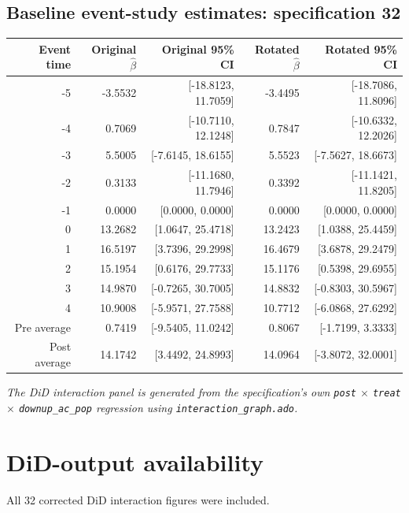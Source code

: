 \documentclass[10pt]{article}
\begin{document}
\subsection*{Baseline event-study estimates: specification 32}
\begin{center}
\scriptsize
\begin{tabular}{r rr rr}
\toprule
Event time & Original $\hat\beta$ & Original 95\% CI & Rotated $\hat\beta$ & Rotated 95\% CI \\
\midrule
-5 & -3.5532 & [-18.8123, 11.7059] & -3.4495 & [-18.7086, 11.8096] \\
-4 & 0.7069 & [-10.7110, 12.1248] & 0.7847 & [-10.6332, 12.2026] \\
-3 & 5.5005 & [-7.6145, 18.6155] & 5.5523 & [-7.5627, 18.6673] \\
-2 & 0.3133 & [-11.1680, 11.7946] & 0.3392 & [-11.1421, 11.8205] \\
-1 & 0.0000 & [0.0000, 0.0000] & 0.0000 & [0.0000, 0.0000] \\
0 & 13.2682 & [1.0647, 25.4718] & 13.2423 & [1.0388, 25.4459] \\
1 & 16.5197 & [3.7396, 29.2998] & 16.4679 & [3.6878, 29.2479] \\
2 & 15.1954 & [0.6176, 29.7733] & 15.1176 & [0.5398, 29.6955] \\
3 & 14.9870 & [-0.7265, 30.7005] & 14.8832 & [-0.8303, 30.5967] \\
4 & 10.9008 & [-5.9571, 27.7588] & 10.7712 & [-6.0868, 27.6292] \\
\midrule
Pre average & 0.7419 & [-9.5405, 11.0242] & 0.8067 & [-1.7199, 3.3333] \\
Post average & 14.1742 & [3.4492, 24.8993] & 14.0964 & [-3.8072, 32.0001] \\
\bottomrule
\end{tabular}
\end{center}
\medskip
\textit{The DiD interaction panel is generated from the specification's own \texttt{post} $\times$ \texttt{treat} $\times$ \texttt{downup\_ac\_pop} regression using \texttt{interaction\_graph.ado}.}
\clearpage
\section*{DiD-output availability}
All 32 corrected DiD interaction figures were included.
\end{document}
